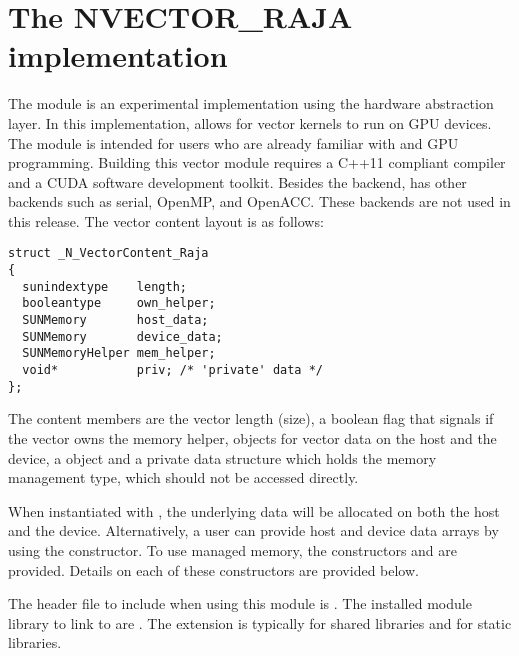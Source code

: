 %
\section{The NVECTOR\_RAJA implementation}\label{ss:nvec_raja}

The {\nvecraja} module is an experimental {\nvector} implementation using the
\href{https://software.llnl.gov/RAJA/}{\raja} hardware abstraction layer.
In this implementation, {\raja}
allows for {\sundials} vector kernels to run on GPU devices. The module is intended for users
who are already familiar with {\raja} and GPU programming. Building this vector
module requires a C++11 compliant compiler and a CUDA software development toolkit.
Besides the {\cuda} backend, {\raja} has other backends such as serial, OpenMP,
and OpenACC. These backends are not used in this {\sundials} release.
The vector content layout is as follows:
\begin{verbatim}
struct _N_VectorContent_Raja
{
  sunindextype    length;
  booleantype     own_helper;
  SUNMemory       host_data;
  SUNMemory       device_data;
  SUNMemoryHelper mem_helper;
  void*           priv; /* 'private' data */
};
\end{verbatim}
The content members are the vector length (size), a boolean flag that signals if
the vector owns the memory helper,  objects for vector data on the
host and the device, a  object and a private data structure
which holds the memory management type, which should not be accessed directly.

When instantiated with , the underlying data will be allocated
on both the host and the device. Alternatively, a user can provide host and device
data arrays by using the  constructor. To use {\raja} managed
memory, the constructors  and \newline
{} are provided. Details on each of these constructors
are provided below.


The header file to include when using this module is .
The installed module library to link to are .
The extension  is typically  for shared libraries and 
for static libraries.


